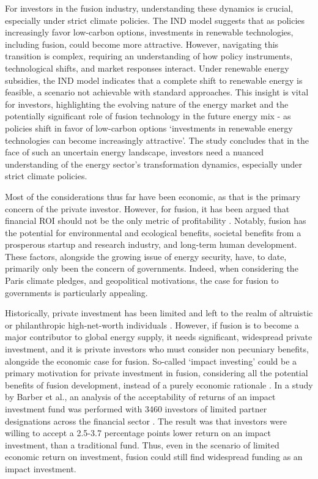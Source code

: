 For investors in the fusion industry, understanding these dynamics is crucial, especially under strict climate policies. The IND model suggests that as policies increasingly favor low-carbon options, investments in renewable technologies, including fusion, could become more attractive. However, navigating this transition is complex, requiring an understanding of how policy instruments, technological shifts, and market responses interact. Under renewable energy subsidies, the IND model indicates that a complete shift to renewable energy is feasible, a scenario not achievable with standard approaches. This insight is vital for investors, highlighting the evolving nature of the energy market and the potentially significant role of fusion technology in the future energy mix - as policies shift in favor of low-carbon options ‘investments in renewable energy technologies can become increasingly attractive’. The study concludes that in the face of such an uncertain energy landscape, investors need a nuanced understanding of the energy sector's transformation dynamics, especially under strict climate policies.

Most of the considerations thus far have been economic, as that is the primary concern of the private investor. However, for fusion, it has been argued that financial ROI should not be the only metric of profitability \cite{roncaglia1989research}. Notably, fusion has the potential for environmental and ecological benefits, societal benefits from a prosperous startup and research industry, and long-term human development. These factors, alongside the growing issue of energy security, have, to date, primarily only been the concern of governments. Indeed, when considering the Paris climate pledges, and geopolitical motivations, the case for fusion to governments is particularly appealing. 

Historically, private investment has been limited and left to the realm of altruistic or philanthropic high-net-worth individuals \cite{halem2021financing}. However, if fusion is to become a major contributor to global energy supply, it needs significant, widespread private investment, and it is private investors who must consider non pecuniary benefits, alongside the economic case for fusion. So-called ‘impact investing’ could be a primary motivation for private investment in fusion, considering all the potential benefits of fusion development, instead of a purely economic rationale \cite{clarkin2016impact}. In a study by Barber et al., an analysis of the acceptability of returns of an impact investment fund was performed with 3460 investors of limited partner designations across the financial sector \cite{barber2021impact}. The result was that investors were willing to accept a 2.5-3.7 percentage points lower return on an impact investment, than a traditional fund. Thus, even in the scenario of limited economic return on investment, fusion could still find widespread funding as an impact investment.




